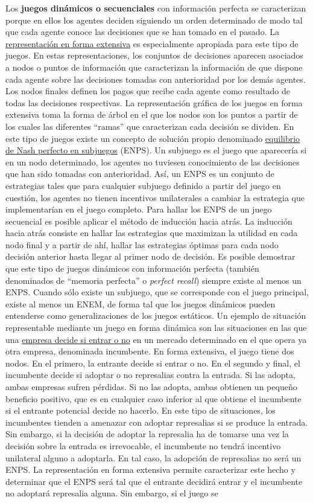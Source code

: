 \documentclass{nuevotema}
\begin{document}
Los \textbf{juegos dinámicos o secuenciales} con información perfecta se caracterizan porque en ellos los agentes deciden siguiendo un orden determinado de modo tal que cada agente conoce las decisiones que se han tomado en el pasado. La \underline{representación en forma extensiva} es especialmente apropiada para este tipo de juegos. En estas representaciones, los conjuntos de decisiones aparecen asociados a nodos o puntos de información que caracterizan la información de que dispone cada agente sobre las decisiones tomadas con anterioridad por los demás agentes. Los nodos finales definen los pagos que recibe cada agente como resultado de todas las decisiones respectivas. La representación gráfica de los juegos en forma extensiva toma la forma de árbol en el que los nodos son los puntos a partir de los cuales las diferentes ``ramas'' que caracterizan cada decisión se dividen. En este tipo de juegos existe un concepto de solución propio denominado \underline{equilibrio de Nash perfecto en subjuegos} (ENPS). Un subjuego es el juego que aparecería si en un nodo determinado, los agentes no tuviesen conocimiento de las decisiones que han sido tomadas con anterioridad. Así, un ENPS es un conjunto de estrategias tales que para cualquier subjuego definido a partir del juego en cuestión, los agentes no tienen incentivos unilaterales a cambiar la estrategia que implementarían en el juego completo. Para hallar los ENPS de un juego secuencial es posible aplicar el método de inducción hacia atrás. La inducción hacia atrás consiste en hallar las estrategias que maximizan la utilidad en cada nodo final y a partir de ahí, hallar las estrategias óptimas para cada nodo decisión anterior hasta llegar al primer nodo de decisión. Es posible demostrar que este tipo de juegos dinámicos con información perfecta (también denominados de ``memoria perfecta'' o \textit{perfect recall}) siempre existe al menos un ENPS. Cuando sólo existe un subjuego, que se corresponde con el juego principal, existe al menos un ENEM, de forma tal que los juegos dinámicos pueden entenderse como generalizaciones de los juegos estáticos. Un ejemplo de situación representable mediante un juego en forma dinámica son las situaciones en las que una \underline{empresa decide si entrar o no} en un mercado determinado en el que opera ya otra empresa, denominada incumbente. En forma extensiva, el juego tiene dos nodos. En el primero, la entrante decide si entrar o no. En el segundo y final, el incumbente decide si adoptar o no represalias contra la entrada. Si las adopta, ambas empresas sufren pérdidas. Si no las adopta, ambas obtienen un pequeño beneficio positivo, que es en cualquier caso inferior al que obtiene el incumbente si el entrante potencial decide no hacerlo. En este tipo de situaciones, los incumbentes tienden a amenazar con adoptar represalias si se produce la entrada. Sin embargo, si la decisión de adoptar la represalia ha de tomarse una vez la decisión sobre la entrada es irrevocable, el incumbente no tendrá incentivo unilateral alguno a adoptarla. En tal caso, la adopción de represalias no será un ENPS. La representación en forma extensiva permite caracterizar este hecho y determinar que el ENPS será tal que el entrante decidirá entrar y el incumbente no adoptará represalia alguna. Sin embargo, si el juego se 
\end{document}
